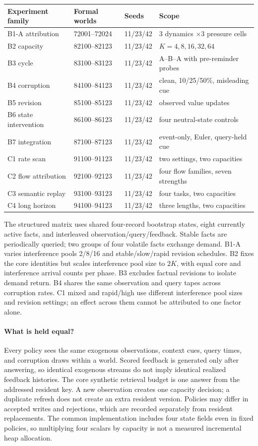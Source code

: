 \begin{center}\small
\begin{tabular}{llll}\toprule
Experiment family & Formal worlds & Seeds & Scope\\\midrule
B1-A attribution & 72001--72024 & 11/23/42 & $3$ dynamics $\times3$ pressure cells\\
B2 capacity & 82100--82123 & 11/23/42 & $K=4,8,16,32,64$\\
B3 cycle & 83100--83123 & 11/23/42 & A--B--A with pre-reminder probes\\
B4 corruption & 84100--84123 & 11/23/42 & clean, 10/25/50\%, misleading cue\\
B5 revision & 85100--85123 & 11/23/42 & observed value updates\\
B6 state intervention & 86100--86123 & 11/23/42 & four neutral-state controls\\
B7 integration & 87100--87123 & 11/23/42 & event-only, Euler, query-held cue\\
C1 rate scan & 91100--91123 & 11/23/42 & two settings, two capacities\\
C2 flow attribution & 92100--92123 & 11/23/42 & four flow families, seven strengths\\
C3 semantic replay & 93100--93123 & 11/23/42 & four tasks, two capacities\\
C4 long horizon & 94100--94123 & 11/23/42 & three lengths, two capacities\\\bottomrule
\end{tabular}
\end{center}

The structured matrix uses shared four-record bootstrap states, eight currently active facts, and interleaved observation/query/feedback. Stable facts are periodically queried; two groups of four volatile facts exchange demand. B1-A varies interference pools 2/8/16 and stable/slow/rapid revision schedules. B2 fixes the core identities but scales interference pool size to $2K$, with equal core and interference arrival counts per phase. B3 excludes factual revisions to isolate demand return. B4 shares the same observation and query tapes across corruption rates. C1 mixed and rapid/high use different interference pool sizes and revision settings; an effect across them cannot be attributed to one factor alone.

\paragraph{What is held equal?}
Every policy sees the same exogenous observations, context cues, query times, and corruption draws within a world. Scored feedback is generated only after answering, so identical exogenous streams do not imply identical realized feedback histories. The core synthetic retrieval budget is one answer from the addressed resident key. A new observation creates one capacity decision; a duplicate refresh does not create an extra resident version. Policies may differ in accepted writes and rejections, which are recorded separately from resident replacements. The common implementation includes four state fields even in fixed policies, so multiplying four scalars by capacity is not a measured incremental heap allocation.


